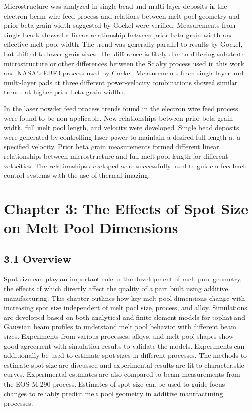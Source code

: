 \documentclass[10pt]{article}
\begin{document}
Microstructure was analyzed in single bead and multi-layer deposits in the electron beam wire feed process and relations between melt pool geometry and prior beta grain width suggested by Gockel were verified. Measurements from single beads showed a linear relationship between prior beta grain width and effective melt pool width. The trend was generally parallel to results by Gockel, but shifted to lower grain sizes. The difference is likely due to differing substrate microstructure or other differences between the Sciaky process used in this work and NASA's EBF3 process used by Gockel. Measurements from single layer and multi-layer pads at three different power-velocity combinations showed similar trends at higher prior beta grain widths.

In the laser powder feed process trends found in the electron wire feed process were found to be non-applicable. New relationships between prior beta grain width, full melt pool length, and velocity were developed. Single bead deposits were generated by controlling laser power to maintain a desired full length at a specified velocity. Prior beta grain measurements formed different linear relationships between microstructure and full melt pool length for different velocities. The relationships developed were successfully used to guide a feedback control systems with the use of thermal imaging.

\section*{Chapter 3: The Effects of Spot Size on Melt Pool Dimensions}
\subsection*{3.1 Overview}
Spot size can play an important role in the development of melt pool geometry, the effects of which directly affect the quality of a part built using additive manufacturing. This chapter outlines how key melt pool dimensions change with increasing spot size independent of melt pool size, process, and alloy. Simulations are developed based on both analytical and finite element models for tophat and Gaussian beam profiles to understand melt pool behavior with different beam sizes. Experiments from various processes, alloys, and melt pool shapes show good agreement with simulation results to validate the models. Experiments can additionally be used to estimate spot sizes in different processes. The methods to estimate spot size are discussed and experimental results are fit to characteristic curves. Experimental estimates are also compared to beam measurements from the EOS M 290 process. Estimates of spot size can be used to guide focus changes to reliably predict melt pool geometry in additive manufacturing processes.
\end{document}
